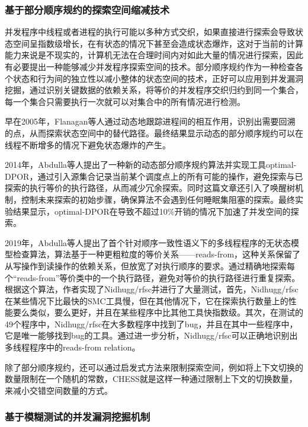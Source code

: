 \subsubsection{基于部分顺序规约的探索空间缩减技术}

并发程序中线程或者进程的执行可能以多种方式交织，如果直接进行探索会导致状态空间呈指数级增长，在有状态的情况下甚至会造成状态爆炸，这对于当前的计算能力来说是不现实的，计算机无法在合理时间内对如此大量的情况进行探索，因此有必要提出一种能够减少并发程序探索空间的技术。部分顺序规约\cite{godefroid1996partial}作为一种检查各个状态和行为间的独立性以减小整体的状态空间的技术，正好可以应用到并发漏洞挖掘，通过识别关键数据的依赖关系，将等价的并发程序交织归约到同一个集合，每一个集合只需要执行一次就可以对集合中的所有情况进行检测。

早在2005年，Flanagan\cite{flanagan2005dynamic}等人通过动态地跟踪进程间的相互作用，识别出需要回溯的点，从而探索状态空间中的替代路径。最终结果显示动态的部分顺序规约可以在线程不断增多的情况下避免状态爆炸的产生。

2014年，Abdulla\cite{abdulla2014optimal}等人提出了一种新的动态部分顺序规约算法并实现工具optimal-DPOR，通过引入源集合记录当前某个调度点上的所有可能的操作，避免探索与已探索的执行等价的执行路径，从而减少冗余探索。同时这篇文章还引入了唤醒树机制，控制未来探索的初始步骤，确保算法不会遇到任何睡眠集阻塞的探索。最终实验结果显示，optimal-DPOR在导致不超过10\%开销的情况下加速了并发空间的探索。

2019年，Abdulla\cite{abdulla2019optimal}等人提出了首个针对顺序一致性语义下的多线程程序的无状态模型检查算法，算法基于一种更粗粒度的等价关系——reads-from，这种关系保留了从写操作到读操作的依赖关系，但放宽了对执行顺序的要求。通过精确地探索每个“reads-from”等价类中的一个执行路径，避免对等价的执行路径进行重复探索。根据这个算法，作者实现了Nidhugg/rfsc并进行了大量测试，首先，Nidhugg/rfsc在某些情况下比最快的SMC工具慢，但在其他情况下，它在探索执行数量上的性能要么类似，要么更好，并且在某些程序中比其他工具快指数级。其次，在测试的49个程序中，Nidhugg/rfsc在大多数程序中找到了bug，并且在其中一些程序中，它是唯一能够找到bug的工具。通过进一步分析，Nidhugg/rfsc可以正确地识别出多线程程序中的reads-from relation。

除了部分顺序规约，还可以通过启发式方法来限制探索空间，例如将上下文切换的数量限制在一个随机的常数，CHESS\cite{musuvathi2008finding}就是这样一种通过限制上下文的切换数量，来减小交错空间数量的方式。

\subsubsection{基于模糊测试的并发漏洞挖掘机制}

